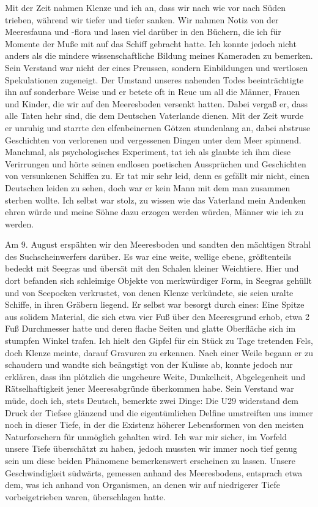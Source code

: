 \documentclass[a4paper]{memoir}
\begin{document}
Mit der Zeit nahmen Klenze und ich an, dass wir nach wie vor nach Süden trieben, während wir tiefer und tiefer sanken. Wir nahmen Notiz von der Meeresfauna und -flora und lasen viel darüber in den Büchern, die ich für Momente der Muße mit auf das Schiff gebracht hatte. Ich konnte jedoch nicht anders als die mindere wissenschaftliche Bildung meines Kameraden zu bemerken. Sein Verstand war nicht der eines Preussen, sondern Einbildungen und wertlosen Spekulationen zugeneigt. Der Umstand unseres nahenden Todes beeinträchtigte ihn auf sonderbare Weise und er betete oft in Reue um all die Männer, Frauen und Kinder, die wir auf den Meeresboden versenkt hatten. Dabei vergaß er, dass alle Taten hehr sind, die dem Deutschen Vaterlande dienen.
Mit der Zeit wurde er unruhig und starrte den elfenbeinernen Götzen stundenlang an, dabei abstruse Geschichten von verlorenen und vergessenen Dingen unter dem Meer spinnend. Manchmal, als psychologisches Experiment, tat ich als glaubte ich ihm diese Verirrungen und hörte seinen endlosen poetischen Aussprüchen und Geschichten von versunkenen Schiffen zu. Er tat mir sehr leid, denn es gefällt mir nicht, einen Deutschen leiden zu sehen, doch war er kein Mann mit dem man zusammen sterben wollte. Ich selbst war stolz, zu wissen wie das Vaterland mein Andenken ehren würde und meine Söhne dazu erzogen werden würden, Männer wie ich zu werden.

Am 9. August erspähten wir den Meeresboden und sandten den mächtigen Strahl des Suchscheinwerfers darüber. Es war eine weite, wellige ebene, größtenteils bedeckt mit Seegras und übersät mit den Schalen kleiner Weichtiere. Hier und dort befanden sich schleimige Objekte von merkwürdiger Form, in Seegras gehüllt und von Seepocken verkrustet, von denen Klenze verkündete, sie seien uralte Schiffe, in ihren Gräbern liegend. Er selbst war besorgt durch eines: Eine Spitze aus solidem Material, die sich etwa vier Fuß über den Meeresgrund erhob, etwa 2 Fuß Durchmesser hatte und deren flache Seiten und glatte Oberfläche sich im stumpfen Winkel trafen. Ich hielt den Gipfel für ein Stück zu Tage tretenden Fels, doch Klenze meinte, darauf Gravuren zu erkennen. Nach einer Weile begann er zu schaudern und wandte sich beängstigt von der Kulisse ab, konnte jedoch nur erklären, dass ihn plötzlich die ungeheure Weite, Dunkelheit, Abgelegenheit und Rätselhaftigkeit jener Meeresabgründe überkommen habe. Sein Verstand war müde, doch ich, stets Deutsch, bemerkte zwei Dinge: Die U29 widerstand dem Druck der Tiefsee glänzend und die eigentümlichen Delfine umstreiften uns immer noch in dieser Tiefe, in der die Existenz höherer Lebensformen von den meisten Naturforschern für unmöglich gehalten wird. Ich war mir sicher, im Vorfeld unsere Tiefe überschätzt zu haben, jedoch mussten wir immer noch tief genug sein um diese beiden Phänomene bemerkenswert erscheinen zu lassen. Unsere Geschwindigkeit südwärts, gemessen anhand des Meeresbodens, entsprach etwa dem, was ich anhand von Organismen, an denen wir auf niedrigerer Tiefe vorbeigetrieben waren, überschlagen hatte.
\end{document}
